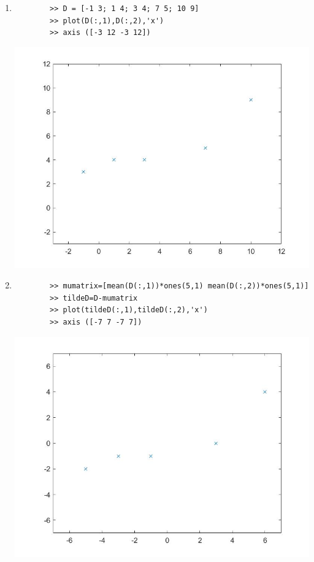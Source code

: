 \begin{sol}
\begin{enumerate}
    \item \begin{verbatim}
        >> D = [-1 3; 1 4; 3 4; 7 5; 10 9]
        >> plot(D(:,1),D(:,2),'x')
        >> axis ([-3 12 -3 12])
    \end{verbatim}
    \begin{center}
        \includegraphics[scale=.3]{FacesNight7/figs/Dplot.jpg}
    \end{center}
    
    \item \begin{verbatim}
        >> mumatrix=[mean(D(:,1))*ones(5,1) mean(D(:,2))*ones(5,1)]
        >> tildeD=D-mumatrix
        >> plot(tildeD(:,1),tildeD(:,2),'x')
        >> axis ([-7 7 -7 7])
    \end{verbatim}
    \begin{center}
        \includegraphics[scale=.3]{FacesNight7/figs/tildeDplot.jpg}
    \end{center}
    

\end{enumerate}
\end{sol}
